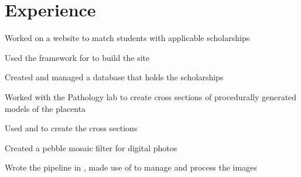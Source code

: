 \documentclass[]{deedy-resume-openfont}
\begin{document}
\begin{minipage}[t]{0.66\textwidth} 
\section{Experience}
\vspace{\topsep} %
\begin{tightemize}
\item Worked on a website to match students with applicable scholarships
\item Used the framework for to build the site
\item Created and managed a database that holds the scholarships
\end{tightemize}
\sectionsep
{}
\begin{tightemize}
\item Worked with the Pathology lab to create cross sections of procedurally generated models of the placenta
\item Used and to create the cross sections
\end{tightemize}
\sectionsep
{}
\begin{tightemize}
\item Created a pebble mosaic filter for digital photos
\item Wrote the pipeline in , made use of to manage and process the images
\end{tightemize}
\sectionsep

\end{minipage}
\end{document}

